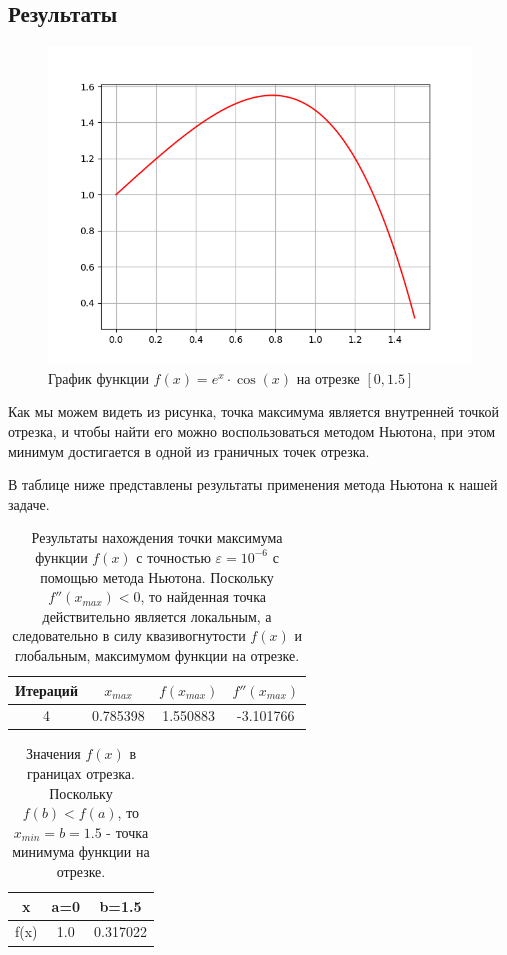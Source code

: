 \documentclass[12pt]{article}%
\begin{document}
\subsection{Результаты}
\begin{figure}[!h]
    \centering
    \includegraphics[width=\textwidth]{task1_plot.png}
    \caption{График функции $f(x) = e^x \cdot \cos(x)$ на отрезке $[0, 1.5]$}
\end{figure}

Как мы можем видеть из рисунка, точка максимума является внутренней точкой отрезка, и чтобы найти его можно воспользоваться методом Ньютона, при этом минимум достигается в одной из граничных точек отрезка.

В таблице ниже представлены результаты применения метода Ньютона к нашей задаче.

\begin{table}[!h]
\centering
\begin{tabular}{|c|c|c|c|}
    \hline Итераций & $x_{max}$ & $f(x_{max})$ & $f''(x_{max})$  \\
    \hline 4 & 0.785398 & 1.550883 & -3.101766 \\
    \hline
\end{tabular}
    \caption{Результаты нахождения точки максимума функции $f(x)$ с точностью $\varepsilon = 10^{-6}$ с помощью метода Ньютона. Поскольку $f''(x_{max}) < 0$, то найденная точка действительно является локальным, а следовательно в силу квазивогнутости $f(x)$ и глобальным, максимумом функции на отрезке.}
\end{table}

\begin{table}[!h]
    \centering
    \begin{tabular}{|c|c|c|}
    \hline x & a=0 & b=1.5  \\
    \hline f(x) & 1.0 & 0.317022 \\
    \hline
    \end{tabular}
    \caption{Значения $f(x)$ в границах отрезка. Поскольку $f(b) < f(a)$, то $x_{min} = b = 1.5$ - точка минимума функции на отрезке.}
\end{table}
\end{document}
